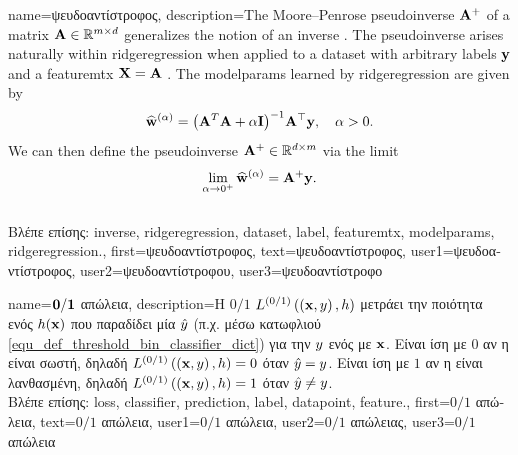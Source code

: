 {name={\foreignlanguage{greek}{ψευδοαντίστροφος}},
 	description={The Moore–Penrose pseudoinverse ${\bf A}^{+}$ 
 		of a matrix ${\bf A} \in \mathbb{R}^{m \times d}$ generalizes the 
		notion of an \gls{inverse} \cite{GolubVanLoanBook}. The pseudoinverse arises naturally 
 		within \gls{ridgeregression} when applied to a \gls{dataset} with arbitrary \gls{label}s ${\bf y}$ 
 		and a \gls{featuremtx} ${\bf X} = {\bf A}$ \cite[Ch.\ 3]{hastie01statisticallearning}. The \gls{modelparams} 
 		learned by \gls{ridgeregression} are given by
  		\[
  		\widehat{{\bf w}}^{(\alpha)}  = \big({\bf A}^T {\bf A} + \alpha \mathbf{I} \big)^{-1} {\bf A}^\top {\bf y}, \quad \alpha > 0.
  		\]
  		We can then define the pseudoinverse  ${\bf A}^+ \in \mathbb{R}^{d \times m}$ via 
  		the limit \cite[Ch. 3]{benisrael2003generalized}
  		\[
  		\lim_{\alpha \to 0^+} \widehat{{\bf w}}^{(\alpha)} = {\bf A}^+ {\bf y}.
  		\] \\
		\foreignlanguage{greek}{Βλέπε επίσης:} \gls{inverse}, \gls{ridgeregression}, \gls{dataset}, \gls{label}, 
		\gls{featuremtx}, \gls{modelparams}, \gls{ridgeregression}.},
 	first={\foreignlanguage{greek}{ψευδοαντίστροφος}},
 	text={\foreignlanguage{greek}{ψευδοαντίστροφος}},
	user1={\foreignlanguage{greek}{ψευδοαντίστροφος}}, %
    	user2={\foreignlanguage{greek}{ψευδοαντίστροφου}}, %
	user3={\foreignlanguage{greek}{ψευδοαντίστροφο}} %
 }

{name={$\bf 0/1$ \foreignlanguage{greek}{απώλεια}},
	description={\foreignlanguage{greek}{H} $0/1$  
		$L^{(0/1)}\left(\left( {\bf x},y \right),h \right)$ \foreignlanguage{greek}{μετράει την ποιότητα ενός} 
		 $h({\bf x})$ \foreignlanguage{greek}{που παραδίδει μία} 
		 $\hat{y}$ (\foreignlanguage{greek}{π.χ. μέσω κατωφλιού} \eqref{equ_def_threshold_bin_classifier_dict}) 
		\foreignlanguage{greek}{για την}  $y$ \foreignlanguage{greek}{ενός}  
		\foreignlanguage{greek}{με}  ${\bf x}$. \foreignlanguage{greek}{Εί\-ναι ίση με $0$ αν η} 
		 \foreignlanguage{greek}{είναι σωστή, δηλαδή 
		$L^{(0/1)}\left(\left( {\bf x},y \right),h \right)=0$ όταν $\hat{y}=y$. Είναι ίση με
		$1$ αν η}  \foreignlanguage{greek}{είναι λανθασμένη, δηλαδή $L^{(0/1)}\left(\left( {\bf x},y \right),h \right)=1$ 
		όταν} $\hat{y}\neq y$.\\
		\foreignlanguage{greek}{Βλέπε επίσης:} \gls{loss}, \gls{classifier}, \gls{prediction}, \gls{label}, \gls{datapoint}, \gls{feature}.},
    	first={\foreignlanguage{greek}{$0/1$ απώλεια}},
    	text={\foreignlanguage{greek}{$0/1$ απώλεια}},
    	user1={\foreignlanguage{greek}{$0/1$ απώλεια}}, %
    	user2={\foreignlanguage{greek}{$0/1$ απώλειας}}, %
    	user3={\foreignlanguage{greek}{$0/1$ απώλεια}} %
}







